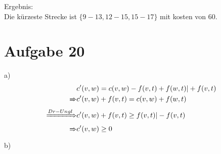 \documentclass[a4paper,10pt,german]{scrartcl}
\begin{document}
Ergebnis:\\

Die k\"urzeste Strecke ist $\{9-13,12-15,15-17\} $ mit kosten von 60.

\section{Aufgabe 20}
a)\\
\begin{align}
	&c'(v,w) = c(v,w) - f(v,t) + f(w,t) | + f(v,t)\\
	\xRightarrow{} &c'(v,w) + f(v,t) = c(v,w) + f(w,t)\\
	\xRightarrow{Dr-Ungl} &c'(v,w) + f(v,t) \ge f(v,t) | - f(v,t)\\
	\xRightarrow{} &c'(v,w) \ge 0
\end{align}
b)\\
\end{document}
